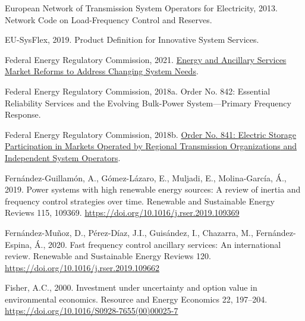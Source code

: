 \documentclass[12pt,a4paper,]{report}
\newlength{\cslhangindent}
\newenvironment{CSLReferences}[2] %
 {%
  \setlength{\parindent}{0pt}
  \ifodd #1 \everypar{\setlength{\hangindent}{\cslhangindent}}\ignorespaces\fi
  \ifnum #2 > 0
  \setlength{\parskip}{#2\baselineskip}
  \fi
 }%
 {}
\begin{document}
\begin{CSLReferences}{1}{0}
\leavevmode{}%
European Network of Transmission System Operators for Electricity, 2013.
Network {Code} on {Load-Frequency Control} and {Reserves}.

\leavevmode{}%
EU-SysFlex, 2019. Product {Definition} for {Innovative System Services}.

\leavevmode{}%
Federal Energy Regulatory Commission, 2021.
\href{https://www.ferc.gov/news-events/news/ferc-staff-issues-report-energy-and-ancillary-services-market-reforms-address}{Energy
and {Ancillary Services Market Reforms} to {Address Changing System
Needs}}.

\leavevmode{}%
Federal Energy Regulatory Commission, 2018a. Order {No}. 842: {Essential
Reliability Services} and the {Evolving Bulk-Power System}---{Primary
Frequency Response}.

\leavevmode{}%
Federal Energy Regulatory Commission, 2018b.
\href{https://www.ferc.gov/media/order-no-841}{Order {No}. 841:
{Electric Storage Participation} in {Markets Operated} by {Regional
Transmission Organizations} and {Independent System Operators}}.

\leavevmode{}%
Fernández-Guillamón, A., Gómez-Lázaro, E., Muljadi, E., Molina-García,
Á., 2019. Power systems with high renewable energy sources: {A} review
of inertia and frequency control strategies over time. Renewable and
Sustainable Energy Reviews 115, 109369.
\url{https://doi.org/10.1016/j.rser.2019.109369}

\leavevmode{}%
Fernández-Muñoz, D., Pérez-Díaz, J.I., Guisández, I., Chazarra, M.,
Fernández-Espina, Á., 2020. Fast frequency control ancillary services:
{An} international review. Renewable and Sustainable Energy Reviews 120.
\url{https://doi.org/10.1016/j.rser.2019.109662}

\leavevmode{}%
Fisher, A.C., 2000. Investment under uncertainty and option value in
environmental economics. Resource and Energy Economics 22, 197--204.
\url{https://doi.org/10.1016/S0928-7655(00)00025-7}


\end{CSLReferences}
\end{document}
